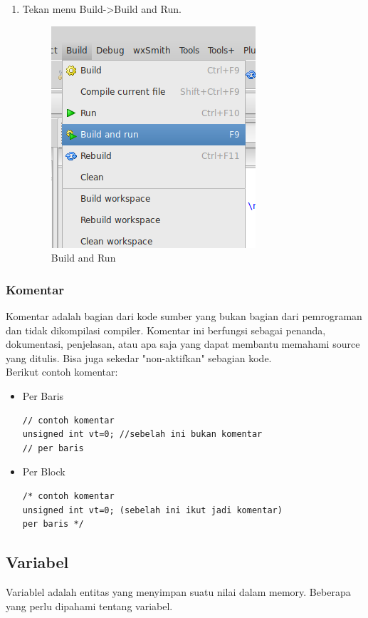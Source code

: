 \documentclass[12pt,]{article}
\begin{document}
\begin{enumerate}
\begin{verbatim}
int main() {
	printf("Hello, World! \n");
	return 0;
}
		\end{verbatim}
		\item Tekan menu Build->Build and Run.
		\begin{figure}[H]
			\centering
			\includegraphics[width=0.4\linewidth]{images/c_cb_9}
			\caption{Build and Run}
		\end{figure}
			
	\end{enumerate}

	\subsubsection{Komentar}
	Komentar adalah bagian dari kode sumber yang bukan bagian dari pemrograman dan tidak dikompilasi compiler.
	Komentar ini berfungsi sebagai penanda, dokumentasi, penjelasan, atau apa saja yang dapat membantu memahami source yang ditulis.
	Bisa juga sekedar "non-aktifkan" sebagian kode.\\
	Berikut contoh komentar:
	\begin{itemize}
		\item Per Baris
		\begin{verbatim}
// contoh komentar
unsigned int vt=0; //sebelah ini bukan komentar
// per baris
		\end{verbatim}
		
		\item Per Block
		\begin{verbatim}
/* contoh komentar
unsigned int vt=0; (sebelah ini ikut jadi komentar)
per baris */
		\end{verbatim}
	\end{itemize}

	\newpage
	\subsection{Variabel}
	Variablel adalah entitas yang menyimpan suatu nilai dalam memory.
	Beberapa yang perlu dipahami tentang variabel.
	
\end{document}
